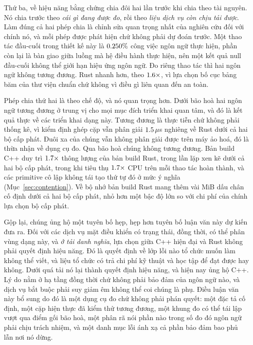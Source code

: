 Thứ ba, về hiệu năng bằng chứng chia đôi hai lần trước khi chia theo tài nguyên. Nó chia trước
theo \emph{cái gì đang được đo}, rồi theo \emph{liệu dịch vụ còn chịu tải được}. Làm đúng cả hai
phép chia là chỉnh sửa quan trọng nhất của nghiên cứu đối với chính nó, và mỗi phép được phát hiện
chứ không phải dự đoán trước. Một thao tác đầu-cuối trong thiết kế này là $0.250\%$
công việc ngôn ngữ thực hiện, phần còn lại là bàn giao giữa luồng mà hệ điều hành thực hiện, nên
một kết quả null đầu-cuối không thể giới hạn hiệu ứng ngôn ngữ. Đo riêng thao tác thì hai ngôn ngữ
không tương đương. Rust nhanh hơn, theo $1.6\times$, vì
lựa chọn bố cục bảng băm của thư viện chuẩn chứ không vì điều gì
liên quan đến an toàn.

Phép chia thứ hai là theo chế độ, và nó quan trọng hơn. Dưới bão hoà hai ngôn ngữ tương đương ở
trung vị cho mọi mục đích triển khai quan tâm, và đó là kết quả thực về các triển khai dạng này.
Tương đương là thực tiễn chứ không phải thống kê, vì kiểm định ghép cặp vẫn phân giải
$1.5\,\mu$s nghiêng về Rust dưới cả hai bộ cấp phát. Đuôi xa của chúng vẫn không phân
giải được trên máy ảo hoá, đó là thừa nhận về dụng cụ đo. Qua bão hoà chúng không tương đương. Bản
build C++ duy trì $1.7\times$ thông lượng của bản build Rust, trong
\OverloadThrAgree{} lần lặp xen kẽ dưới cả hai bộ cấp phát, trong khi tiêu thụ
$1.7\times$ CPU trên mỗi thao tác hoàn thành, và các primitive cô lập không tái
tạo thứ tự đó ở mức ý nghĩa (Mục~\ref{sec:contention}). Về bộ nhớ bản build Rust mang thêm vài MiB
dấu chân cố định dưới cả hai bộ cấp phát, nhỏ hơn một bậc độ lớn so với chi phí của chính lựa chọn
bộ cấp phát.

Gộp lại, chúng ủng hộ một tuyên bố hẹp, hẹp hơn tuyên bố luận văn này dự kiến
đưa ra. Đối với các dịch vụ mặt điều khiển có trạng thái, đồng thời, có thể phân vùng dạng này, và
\emph{ở tải danh nghĩa}, lựa chọn giữa C++ hiện đại và Rust không phải quyết định hiệu năng. Đó là
quyết định về lớp lỗi nào tổ chức muốn làm không thể viết, và liệu tổ chức có trả chi phí kỹ thuật
và học tập để đạt được hay không. Dưới quá tải nó lại thành quyết định hiệu năng, và hiện nay ủng
hộ C++. Lý do nằm ở hạ tầng đồng thời chứ không phải bảo đảm của ngôn ngữ nào, và dịch vụ bắt buộc
phải suy giảm êm không thể coi chúng là phụ. Điều luận văn này bổ sung do đó là một dụng cụ đo chứ
không phải phán quyết: một đặc tả cố định, một cặp hiện thực đã kiểm thử tương đương, một khung đo
có thể tái lập vượt qua điểm gối bão hoà, một phân rã nói phần nào trong số đo đó ngôn ngữ phải
chịu trách nhiệm, và một danh mục lỗi ánh xạ cả phần bảo đảm bao phủ lẫn nơi nó dừng.


